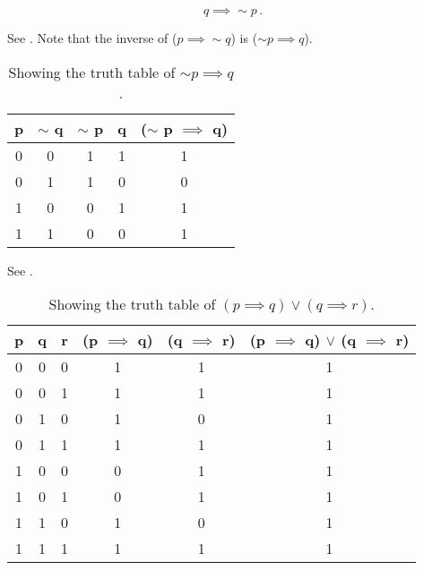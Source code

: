 %
%

\begin{subquestions}
	
\subquestion

\begin{equation}
	q \implies \sim p\,. 
\end{equation}

\subquestion

See . Note that the inverse of ($p \implies \sim q$) is ($\sim p \implies q$).

\begin{table}[ht]
	\centering
	\begin{tabular}{|c|c|c|c|c|}
		\hline
		p & $\sim$ q & $\sim$ p & q & ($\sim$ p $\implies$ q) \\
		\hline
		0 & 0 & 1 & 1 & 1 \\
		0 & 1 & 1 & 0 & 0 \\
		1 & 0 & 0 & 1 & 1 \\
		1 & 1 & 0 & 0 & 1 \\
		\hline
	\end{tabular}
	\caption{\label{2014:q1:tab:Tab1} Showing the truth table of $\sim p \implies q$.}
\end{table}
		
\subquestion

\begin{subsubquestions}
	
\subsubquestion

See .

\begin{table}[ht]
	\centering
	\begin{tabular}{|c|c|c|c|c|c|}
		\hline
		p & q & r & (p $\implies$ q) & (q $\implies$ r) & (p $\implies$ q) $\lor$ (q $\implies$ r) \\
		\hline
		0 & 0 & 0 & 1 & 1 & 1 \\
		0 & 0 & 1 & 1 & 1 & 1 \\
		0 & 1 & 0 & 1 & 0 & 1 \\
		0 & 1 & 1 & 1 & 1 & 1 \\
		1 & 0 & 0 & 0 & 1 & 1 \\
		1 & 0 & 1 & 0 & 1 & 1 \\
		1 & 1 & 0 & 1 & 0 & 1 \\
		1 & 1 & 1 & 1 & 1 & 1 \\
		\hline
	\end{tabular}
	\caption{\label{2014:q1:tab:Tab2} Showing the truth table of $(p \implies q) \lor (q \implies r)$.}
\end{table}


\end{subsubquestions}
\end{subquestions}
